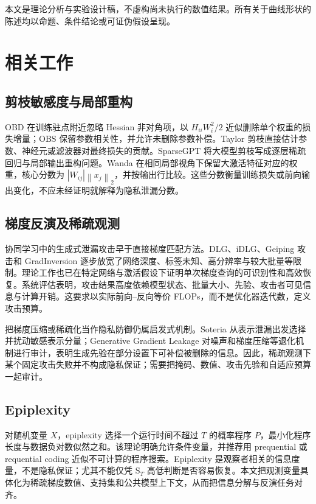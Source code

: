 \documentclass[conference,a4paper]{IEEEtran}
\newcommand{\norm}[1]{\left\lVert #1\right\rVert}
\newcommand{\ST}{\mathrm{S}_{T}}
\begin{document}
本文是理论分析与实验设计稿，不虚构尚未执行的数值结果。所有关于曲线形状的陈述均以命题、条件结论或可证伪假设呈现。

\section{相关工作}

\subsection{剪枝敏感度与局部重构}

OBD 在训练驻点附近忽略 Hessian 非对角项，以 $H_{ii}W_i^2/2$ 近似删除单个权重的损失增量；OBS 保留参数相关性，并允许未删除参数补偿\cite{lecun1989obd,hassibi1993obs}。Taylor 剪枝直接估计参数、神经元或滤波器对最终损失的贡献\cite{molchanov2019importance}。SparseGPT 将大模型剪枝写成逐层稀疏回归与局部输出重构问题\cite{frantar2023sparsegpt}。Wanda 在相同局部视角下保留大激活特征对应的权重，核心分数为 $|W_{ij}|\norm{x_j}_2$，并按输出行比较\cite{sun2024wanda}。这些分数衡量训练损失或前向输出变化，不应未经证明就解释为隐私泄漏分数。

\subsection{梯度反演及稀疏观测}

协同学习中的生成式泄漏攻击早于直接梯度匹配方法\cite{hitaj2017gan}。DLG、iDLG、Geiping 攻击和 GradInversion 逐步放宽了网络深度、标签未知、高分辨率与较大批量等限制\cite{zhu2019dlg,zhao2020idlg,geiping2020inverting,yin2021gradinversion}。理论工作也已在特定网络与激活假设下证明单次梯度查询的可识别性和高效恢复\cite{wang2023provably}。系统评估表明，攻击结果高度依赖模型状态、批量大小、先验、攻击者可见信息与计算开销\cite{huang2021evaluating}。这要求以实际前向--反向等价 FLOPs，而不是优化器迭代数，定义攻击预算。

把梯度压缩或稀疏化当作隐私防御仍属启发式机制。Soteria 从表示泄漏出发选择并扰动敏感表示分量\cite{sun2021soteria}；Generative Gradient Leakage 对噪声和梯度压缩等退化机制进行审计，表明生成先验在部分设置下可补偿被删除的信息\cite{li2022auditing}。因此，稀疏观测下某个固定攻击失败并不构成隐私保证；需要把掩码、数值、攻击先验和自适应预算一起审计。

\subsection{Epiplexity}

对随机变量 $X$，epiplexity 选择一个运行时间不超过 $T$ 的概率程序 $P$，最小化程序长度与数据负对数似然之和\cite{finzi2026epiplexity}。该理论明确允许条件变量，并推荐用 prequential 或 requential coding 近似不可计算的程序搜索。Epiplexity 是观察者相关的信息度量，不是隐私保证；尤其不能仅凭 $\ST$ 高低判断是否容易恢复。本文把观测变量具体化为稀疏梯度数值、支持集和公共模型上下文，从而把信息分解与反演任务对齐。
\end{document}
